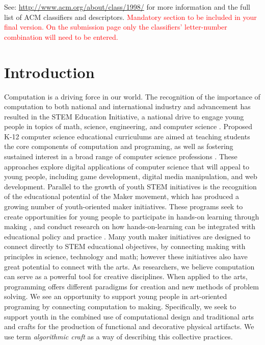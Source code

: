 \documentclass{sigchi}
\begin{document}


See: \url{http://www.acm.org/about/class/1998/}
for more information and the full list of ACM classifiers
and descriptors. 
\textcolor{red}{Mandatory section to be included in your
final version. On the submission page only the classifiers'
letter-number combination will need to be entered.}

\section{Introduction}
Computation is a driving force in our world. The recognition of the importance of computation to both national and international industry and advancement has resulted in the STEM Education Initiative, a national drive to engage young people in topics of math, science, engineering, and computer science \cite{stemReport}. Proposed K-12 computer science educational curriculums are aimed at teaching students the core components of computation and programing, as well as fostering sustained interest in a broad range of computer science professions \cite{k12ModelCur}. These approaches explore digital applications of computer science that will appeal to young people, including game development, digital media manipulation, and web development. Parallel to the growth of youth STEM initiatives is the recognition of the educational potential of the Maker movement, which has produced a growing number of youth-oriented maker initiatives. These programs seek to create opportunities for young people to participate in hands-on learning through making \cite{makerinitiatives}, and conduct research on how hands-on-learning can be integrated with educational policy and practice \cite{maketolearn}. Many youth maker initiatives are designed to connect directly to STEM educational objectives, by connecting making with principles in science, technology and math; however these initiatives also have great potential to connect with the arts. As researchers, we believe computation can serve as a powerful tool for creative disciplines. When applied to the arts, programming offers different paradigms for creation and new methods of problem solving. We see an opportunity to support young people in art-oriented programing by connecting computation to making. Specifically, we seek to support youth in the combined use of computational design and traditional arts and crafts for the production of functional and decorative physical artifacts. We use term \textit{algorithmic craft} as a way of describing this collective practices. %
\end{document}
